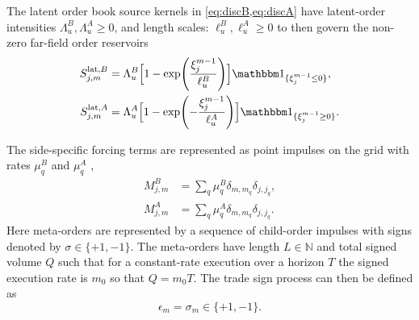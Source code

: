 \documentclass[5p,final]{elsarticle}
\newcommand{\N}{\mathbb{N}}
\begin{document}
The latent order book source kernels in \cref{eq:discB,eq:discA} have latent-order intensities $\Lambda_u^B, \Lambda_u^A\ge 0$, and length scales: $\ell_u^B,\ell_u^A \ge 0$ to then govern the non-zero far-field order reservoirs
\begin{align}
S_{j,m}^{\mathrm{lat},B}
&=
\Lambda_u^B\Bigl[1-\exp\!\left(\frac{\xi_j^{m-1}}{\ell_u^B}\right)\Bigr]\mathbbm 1_{\{\xi_j^{m-1}\le 0\}},
\\
S_{j,m}^{\mathrm{lat},A}
&=
\Lambda_u^A\Bigl[1-\exp\!\left(-\frac{\xi_j^{m-1}}{\ell_u^A}\right)\Bigr]\mathbbm 1_{\{\xi_j^{m-1}\ge 0\}}.
\end{align}

The side-specific forcing terms are represented as point impulses on the grid with rates $\mu_q^B$ and $\mu_q^A$ ,
\begin{align}
M_{j,m}^{B}&=\sum_q \mu_q^B\delta_{m,m_q}\delta_{j,j_q}, \\
M_{j,m}^{A}&=\sum_q  \mu_q^A\delta_{m,m_q}\delta_{j,j_q}.
\end{align}
Here meta-orders are represented by a sequence of child-order impulses with signs denoted by $\sigma \in \{ +1,-1\}$. The meta-orders have length $L \in \N$ and total signed volume $Q$ such that for a constant-rate execution over a horizon $T$ the signed execution rate is $m_0$ so that $Q=m_0 T$. The trade sign process can then be defined as
\begin{equation}
    \epsilon_m = \sigma_m \in\{ +1,-1\}.
\end{equation}
\end{document}
